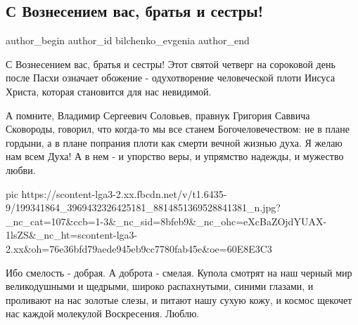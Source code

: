  
 
 
 
 
 
\subsection{С Вознесением вас, братья и сестры!}
\label{sec:10_06_2021.fb.bilchenko_evgenia.3.voznesenie}
\ifcmt
 author_begin
   author_id bilchenko_evgenia
 author_end
\fi

С Вознесением вас, братья и сестры! Этот святой четверг на сороковой день после
Пасхи означает обожение - одухотворение человеческой плоти Иисуса Христа,
которая становится для нас невидимой.

А помните, Владимир Сергеевич Соловьев, правнук Григория Саввича Сковороды,
говорил, что когда-то мы все станем Богочеловечеством: не в плане гордыни, а в
плане попрания плоти как смерти вечной жизнью духа. Я желаю нам всем Духа! А в
нем - и упорство веры, и упрямство надежды, и мужество любви.

\ifcmt
  pic https://scontent-lga3-2.xx.fbcdn.net/v/t1.6435-9/199341864_3969432326425181_8814851369528841381_n.jpg?_nc_cat=107&ccb=1-3&_nc_sid=8bfeb9&_nc_ohc=eXcBaZOjdYUAX-1lsZS&_nc_ht=scontent-lga3-2.xx&oh=76e36bfd79aede945eb9cc7780fab45e&oe=60E8E3C3
\fi

Ибо смелость - добрая. А доброта - смелая. Купола смотрят на наш черный мир
великодушными и щедрыми, широко распахнутыми, синими глазами, и проливают на
нас золотые слезы, и питают нашу сухую кожу, и космос щекочет нас каждой
молекулой Воскресения. Люблю.
